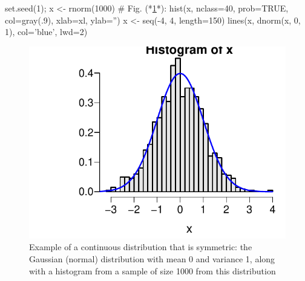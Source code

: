 \begin{Schunk}
\begin{Sinput}
set.seed(1); x <- rnorm(1000)   # Fig. (*\ref{fig:descript-normalhist}*):
hist(x, nclass=40, prob=TRUE, col=gray(.9), xlab=xl, ylab='')
x <- seq(-4, 4, length=150)
lines(x, dnorm(x, 0, 1), col='blue', lwd=2)
\end{Sinput}
\begin{figure}[htbp]

\centerline{\includegraphics[width=\maxwidth]{descript-normalhist-1} }

\caption[Symmetric continuous distribution]{Example of a continuous distribution that is symmetric: the Gaussian (normal) distribution with mean 0 and variance 1, along with a histogram from a sample of size 1000 from this distribution}\label{fig:descript-normalhist}
\end{figure}
\end{Schunk}

